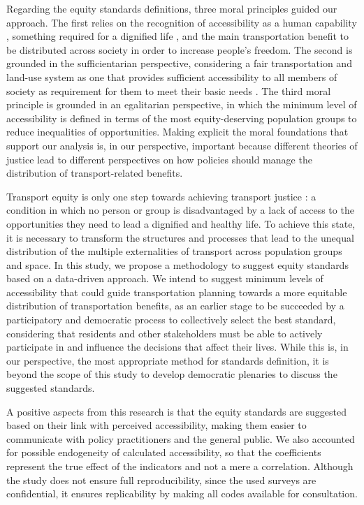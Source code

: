\documentclass[preprint, 3p,
authoryear]{elsarticle} %
\begin{document}
Regarding the equity standards definitions, three moral principles
guided our approach. The first relies on the recognition of
accessibility as a human capability
\citep{sen2005, sen1999, pereira2017, luz2022}, something required for a
dignified life \citep{karner2020}, and the main transportation benefit
to be distributed across society in order to increase people's freedom.
The second is grounded in the sufficientarian perspective, considering a
fair transportation and land-use system as one that provides sufficient
accessibility to all members of society \citep{martens2021} as
requirement for them to meet their basic needs
\citep{pereira2017, pereira2021}. The third moral principle is grounded
in an egalitarian perspective, in which the minimum level of
accessibility is defined in terms of the most equity-deserving
population groups to reduce inequalities of opportunities. Making
explicit the moral foundations that support our analysis is, in our
perspective, important because different theories of justice lead to
different perspectives on how policies should manage the distribution of
transport-related benefits.

Transport equity is only one step towards achieving transport justice
\citep{karner2020}: a condition in which no person or group is
disadvantaged by a lack of access to the opportunities they need to lead
a dignified and healthy life. To achieve this state, it is necessary to
transform the structures and processes that lead to the unequal
distribution of the multiple externalities of transport across
population groups and space. In this study, we propose a methodology to
suggest equity standards based on a data-driven approach. We intend to
suggest minimum levels of accessibility that could guide transportation
planning towards a more equitable distribution of transportation
benefits, as an earlier stage to be succeeded by a participatory and
democratic process to collectively select the best standard, considering
that residents and other stakeholders must be able to actively
participate in and influence the decisions that affect their lives.
While this is, in our perspective, the most appropriate method for
standards definition, it is beyond the scope of this study to develop
democratic plenaries to discuss the suggested standards.

A positive aspects from this research is that the equity standards are
suggested based on their link with perceived accessibility, making them
easier to communicate with policy practitioners and the general public.
We also accounted for possible endogeneity of calculated accessibility,
so that the coefficients represent the true effect of the indicators and
not a mere a correlation. Although the study does not ensure full
reproducibility, since the used surveys are confidential, it ensures
replicability by making all codes available for consultation.
\end{document}
